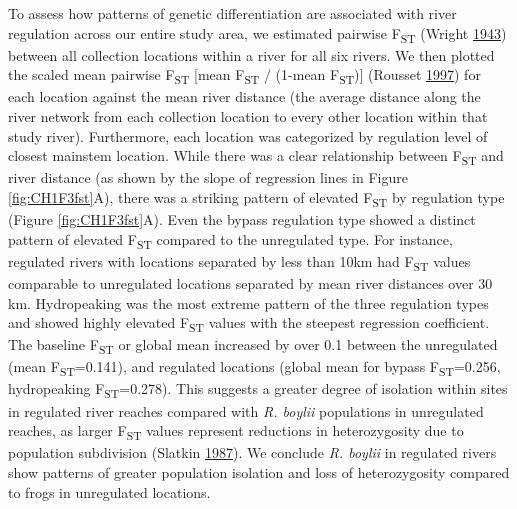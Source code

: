 \documentclass[proquest,12pt,final]{ucthesis-CA2012} %
\begin{document}
\begin{ucmainmatter}
To assess how patterns of genetic differentiation are associated with
river regulation across our entire study area, we estimated pairwise
F\textsubscript{ST} (Wright
\protect\hyperlink{ref-wright_isolation_1943}{1943}) between all
collection locations within a river for all six rivers. We then plotted
the scaled mean pairwise F\textsubscript{ST} {[}mean F\textsubscript{ST}
/ (1-mean F\textsubscript{ST}){]} (Rousset
\protect\hyperlink{ref-rousset_genetic_1997}{1997}) for each location
against the mean river distance (the average distance along the river
network from each collection location to every other location within
that study river). Furthermore, each location was categorized by
regulation level of closest mainstem location. While there was a clear
relationship between F\textsubscript{ST} and river distance (as shown by
the slope of regression lines in Figure \ref{fig:CH1F3fst}A), there was
a striking pattern of elevated F\textsubscript{ST} by regulation type
(Figure \ref{fig:CH1F3fst}A). Even the bypass regulation type showed a
distinct pattern of elevated F\textsubscript{ST} compared to the
unregulated type. For instance, regulated rivers with locations
separated by less than 10km had F\textsubscript{ST} values comparable to
unregulated locations separated by mean river distances over 30 km.
Hydropeaking was the most extreme pattern of the three regulation types
and showed highly elevated F\textsubscript{ST} values with the steepest
regression coefficient. The baseline F\textsubscript{ST} or global mean
increased by over 0.1 between the unregulated (mean
F\textsubscript{ST}=0.141), and regulated locations (global mean for
bypass F\textsubscript{ST}=0.256, hydropeaking
F\textsubscript{ST}=0.278). This suggests a greater degree of isolation
within sites in regulated river reaches compared with \emph{R. boylii}
populations in unregulated reaches, as larger F\textsubscript{ST} values
represent reductions in heterozygosity due to population subdivision
(Slatkin \protect\hyperlink{ref-slatkin_gene_1987}{1987}). We conclude
\emph{R. boylii} in regulated rivers show patterns of greater population
isolation and loss of heterozygosity compared to frogs in unregulated
locations.


\end{ucmainmatter}
\end{document}
